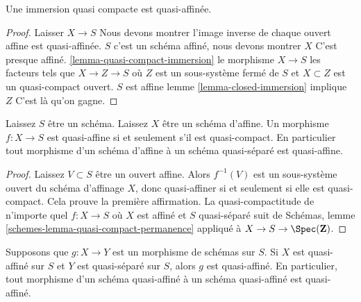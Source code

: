 \begin{lemma}

\label{lemma-quasi-compact-immersion-quasi-affine}

Une immersion quasi compacte est quasi-affinée.

\end{lemma}

\begin{proof}

Laisser $X \to S$ Nous devons montrer l'image inverse de chaque ouvert affine est quasi-affinée. $S$ c'est un schéma affiné, nous devons montrer
$X$ C'est presque affiné. \ref{lemma-quasi-compact-immersion}
le morphisme $X \to S$ les facteurs tels que $X \to Z \to S$ où $Z$ est un sous-système fermé de $S$ et $X \subset Z$ est un quasi-compact ouvert. $S$ est affine lemme \ref{lemma-closed-immersion} implique
$Z$ C'est là qu'on gagne.

\end{proof}

\begin{lemma}

\label{lemma-affine-quasi-affine}
Laissez $S$ être un schéma. Laissez $X$ être un schéma d'affine. Un morphisme $f : X \to S$ est quasi-affine si et seulement s'il est quasi-compact. En particulier tout morphisme d'un schéma d'affine à un schéma quasi-séparé est quasi-affine.
\end{lemma}

\begin{proof}
Laissez $V \subset S$ être un ouvert affine. Alors $f^{-1}(V)$ est un sous-système ouvert du schéma d'affinage $X$, donc quasi-affiner si et seulement si elle est quasi-compact. Cela prouve la première affirmation. La quasi-compactitude de n'importe quel $f : X \to S$ où $X$ est affiné et $S$ quasi-séparé suit de Schémas, lemme \ref{schemes-lemma-quasi-compact-permanence} appliqué à $X \to S \to \Spec(\mathbf{Z})$.
\end{proof}

\begin{lemma}

\label{lemma-quasi-affine-permanence}
Supposons que $g : X \to Y$ est un morphisme de schémas sur $S$. Si $X$ est quasi-affiné sur $S$ et $Y$ est quasi-séparé sur $S$, alors $g$ est quasi-affiné. En particulier, tout morphisme d'un schéma quasi-affiné à un schéma quasi-affiné est quasi-affiné.
\end{lemma}

